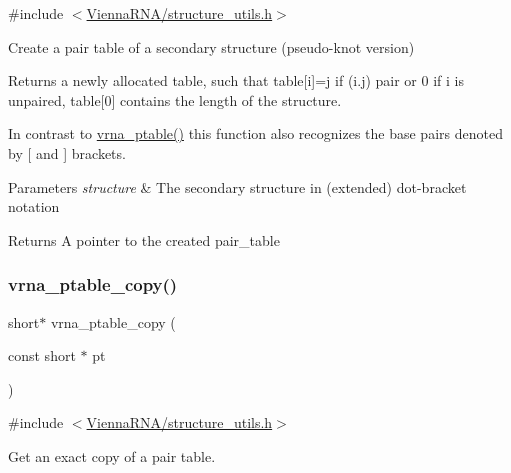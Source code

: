 {\ttfamily \#include $<$\mbox{\hyperlink{structure__utils_8h}{Vienna\+R\+N\+A/structure\+\_\+utils.\+h}}$>$}



Create a pair table of a secondary structure (pseudo-\/knot version) 

Returns a newly allocated table, such that table\mbox{[}i\mbox{]}=j if (i.\+j) pair or 0 if i is unpaired, table\mbox{[}0\mbox{]} contains the length of the structure.

In contrast to \mbox{\hyperlink{group__struct__utils_gae829fb8bb7f694c12a9c0bbc34c77c60}{vrna\+\_\+ptable()}} this function also recognizes the base pairs denoted by \textquotesingle{}\mbox{[}\textquotesingle{} and \textquotesingle{}\mbox{]}\textquotesingle{} brackets.


\begin{DoxyParams}{Parameters}
{\em structure} & The secondary structure in (extended) dot-\/bracket notation \\
\hline
\end{DoxyParams}
\begin{DoxyReturn}{Returns}
A pointer to the created pair\+\_\+table 
\end{DoxyReturn}
\mbox{\label{group__struct__utils_ga2daefbbd6d9f8803731651882f54332d}} 
\subsubsection{\texorpdfstring{vrna\+\_\+ptable\+\_\+copy()}{vrna\_ptable\_copy()}}
{\footnotesize\ttfamily short$\ast$ vrna\+\_\+ptable\+\_\+copy (\begin{DoxyParamCaption}\item[{const short $\ast$}]{pt }\end{DoxyParamCaption})}



{\ttfamily \#include $<$\mbox{\hyperlink{structure__utils_8h}{Vienna\+R\+N\+A/structure\+\_\+utils.\+h}}$>$}



Get an exact copy of a pair table. 


